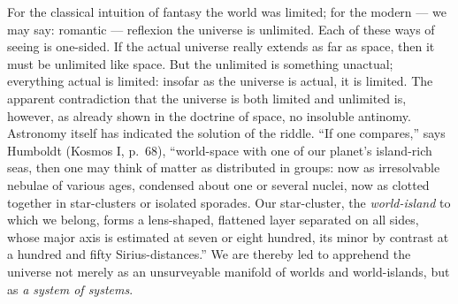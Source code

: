 \documentclass[12pt,a4paper]{book}
\begin{document}
For the classical intuition of fantasy the world was limited; for the modern --- we may say: romantic ---
reflexion the universe is unlimited. Each of these ways of seeing is one-sided. If the actual universe really
extends as far as space, then it must be unlimited like space. But the unlimited is something unactual;
everything actual is limited: insofar as the universe is actual, it is limited. The apparent contradiction
that the universe is both limited and unlimited is, however, as already shown in the doctrine of space, no
insoluble antinomy. Astronomy itself has indicated
the solution of the riddle. ``If one compares,'' says Humboldt (Kosmos I, p.\ 68), ``world-space with one of
our planet's island-rich seas, then one may think of matter as distributed in groups: now as irresolvable
nebulae of various ages, condensed about one or several nuclei, now
as clotted together in star-clusters or isolated sporades. Our star-cluster, the \emph{world-island} to
which we belong, forms a lens-shaped, flattened layer separated on all sides, whose major axis is estimated
at seven or eight hundred, its minor by contrast at a hundred and fifty Sirius-distances.'' We are thereby
led to apprehend the universe not merely as an unsurveyable manifold of worlds and world-islands, but as
\emph{a system of systems}.
\end{document}
